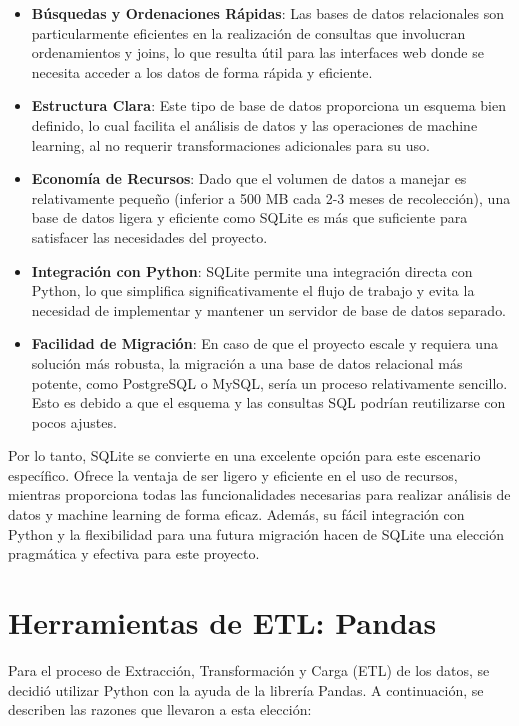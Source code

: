 \begin{itemize}
\item \textbf{Búsquedas y Ordenaciones Rápidas}: Las bases de datos relacionales son particularmente eficientes en la realización de consultas que involucran ordenamientos y joins, lo que resulta útil para las interfaces web donde se necesita acceder a los datos de forma rápida y eficiente.

\item \textbf{Estructura Clara}: Este tipo de base de datos proporciona un esquema bien definido, lo cual facilita el análisis de datos y las operaciones de machine learning, al no requerir transformaciones adicionales para su uso.

\item \textbf{Economía de Recursos}: Dado que el volumen de datos a manejar es relativamente pequeño (inferior a 500 MB cada 2-3 meses de recolección), una base de datos ligera y eficiente como SQLite es más que suficiente para satisfacer las necesidades del proyecto.

\item \textbf{Integración con Python}: SQLite permite una integración directa con Python, lo que simplifica significativamente el flujo de trabajo y evita la necesidad de implementar y mantener un servidor de base de datos separado.

\item \textbf{Facilidad de Migración}: En caso de que el proyecto escale y requiera una solución más robusta, la migración a una base de datos relacional más potente, como PostgreSQL o MySQL, sería un proceso relativamente sencillo. Esto es debido a que el esquema y las consultas SQL podrían reutilizarse con pocos ajustes.
\end{itemize}

Por lo tanto, SQLite se convierte en una excelente opción para este escenario específico. Ofrece la ventaja de ser ligero y eficiente en el uso de recursos, mientras proporciona todas las funcionalidades necesarias para realizar análisis de datos y machine learning de forma eficaz. Además, su fácil integración con Python y la flexibilidad para una futura migración hacen de SQLite una elección pragmática y efectiva para este proyecto.

\section{Herramientas de ETL: Pandas}

Para el proceso de Extracción, Transformación y Carga (ETL) de los datos, se decidió utilizar Python con la ayuda de la librería Pandas. A continuación, se describen las razones que llevaron a esta elección:

